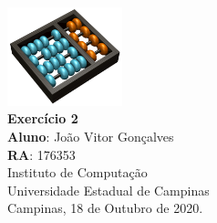 \documentclass[12pt,a4paper]{report}
\begin{document}
\begin{titlepage}
        \begin{center}
                \vspace*{1cm}
                \includegraphics[width=0.25\textwidth]{Logo}\\
                \vspace{1.5cm}
                \Huge
                \textbf{Exercício 2}\\
                \vspace{1.5cm}
                \Large
                \textbf{Aluno}: João Vitor Gonçalves\\
                \textbf{RA}: 176353\\
                \vspace{1.2cm}
                \Large
                Instituto de Computação\\
                Universidade Estadual de Campinas\\
                \vspace{1.5cm}
                Campinas, 18 de Outubro de 2020.
        \end{center}
\end{titlepage}
\tableofcontents
\clearpage

\newcommand{\shellcmd}[1]{\texttt{\footnotesize\# #1}}%



\end{document}
